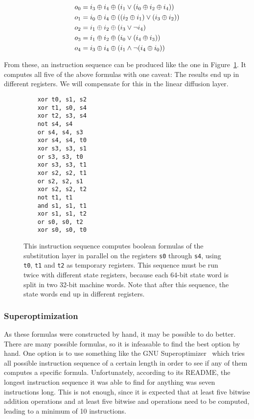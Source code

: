 \begin{samepage}
\begin{align*}
   o_0 & = i_3 \oplus i_4 \oplus (i_1 \vee (i_0 \oplus i_2 \oplus i_4))
\\ o_1 & = i_0 \oplus i_4 \oplus ((i_2 \oplus i_1) \vee (i_3 \oplus i_2))
\\ o_2 & = i_1 \oplus i_2 \oplus (i_3 \vee \neg i_4)
\\ o_3 & = i_1 \oplus i_2 \oplus (i_0 \vee (i_4 \oplus i_3))
\\ o_4 & = i_3 \oplus i_4 \oplus (i_1 \wedge \neg (i_4 \oplus i_0))
\end{align*}
\end{samepage}

From these, an instruction sequence can be produced like the one in
Figure~\ref{substitution}. It computes all five of the above formulas with one
caveat: The results end up in different registers. We will compensate
for this in the linear diffusion layer.

\begin{figure}
\begin{verbatim}
    xor t0, s1, s2
    xor t1, s0, s4
    xor t2, s3, s4
    not s4, s4
    or s4, s4, s3
    xor s4, s4, t0
    xor s3, s3, s1
    or s3, s3, t0
    xor s3, s3, t1
    xor s2, s2, t1
    or s2, s2, s1
    xor s2, s2, t2
    not t1, t1
    and s1, s1, t1
    xor s1, s1, t2
    or s0, s0, t2
    xor s0, s0, t0
\end{verbatim}

\caption{This instruction sequence computes boolean formulas of the substitution
layer in parallel on the registers \texttt{s0} through \texttt{s4}, using
\texttt{t0}, \texttt{t1} and \texttt{t2} as temporary registers. This sequence
must be run twice with different state registers, because each 64-bit state word
is split in two 32-bit machine words. Note that after this sequence, the state
words end up in different registers.}
\label{substitution}
\end{figure}

\subsubsection{Superoptimization}

As these formulas were constructed by hand, it may be possible to do better.
There are many possible formulas, so it is infeasable to find the best option by
hand. One option is to use something like the GNU
Superoptimizer~\cite{superoptimizer} which tries all possible instruction
sequence of a certain length in order to see if any of them computes a specific
formula. Unfortunately, according to its README, the longest instruction
sequence it was able to find for anything was seven instructions long. This is
not enough, since it is expected that at least five bitwise addition operations
and at least five bitwise and operations need to be computed, leading to a
minimum of 10 instructions.

